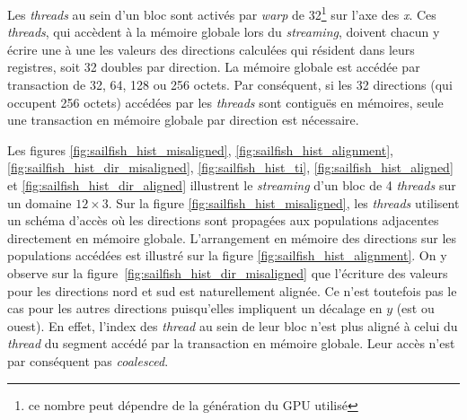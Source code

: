 Les \textit{threads} au sein d'un bloc sont activés par \textit{warp} de 32\footnote{ce nombre peut dépendre de la génération du \ac{GPU} utilisé} sur l'axe des \textit{x}. Ces \textit{threads}, qui accèdent à la mémoire globale lors du \textit{streaming}, doivent chacun y écrire une à une les valeurs des directions calculées qui résident dans leurs registres, soit 32 doubles par direction. La mémoire globale est accédée par transaction de 32, 64, 128 ou 256 octets. Par conséquent, si les 32 directions (qui occupent 256 octets) accédées par les \textit{threads} sont contiguës en mémoires, seule une transaction en mémoire globale par direction est nécessaire. 

Les figures \ref{fig:sailfish_hist_misaligned}, \ref{fig:sailfish_hist_alignment}, \ref{fig:sailfish_hist_dir_misaligned}, \ref{fig:sailfish_hist_ti}, \ref{fig:sailfish_hist_aligned} et \ref{fig:sailfish_hist_dir_aligned} illustrent le \textit{streaming} d'un bloc de 4 \textit{threads} sur un domaine $12 \times 3$.
Sur la figure \ref{fig:sailfish_hist_misaligned}, les \textit{threads} utilisent un schéma d'accès où les directions sont propagées aux populations adjacentes directement en mémoire globale. L'arrangement en mémoire des directions sur les populations accédées est illustré sur la figure \ref{fig:sailfish_hist_alignment}. On y observe sur la figure~\ref{fig:sailfish_hist_dir_misaligned} que l'écriture des valeurs pour les directions nord et sud est naturellement alignée. Ce n'est toutefois pas le cas pour les autres directions puisqu'elles impliquent un décalage en $y$ (est ou ouest). En effet, l'index des \textit{thread} au sein de leur bloc n'est plus aligné à celui du \textit{thread} du segment accédé par la transaction en mémoire globale. Leur accès n'est par conséquent pas \textit{coalesced}.

